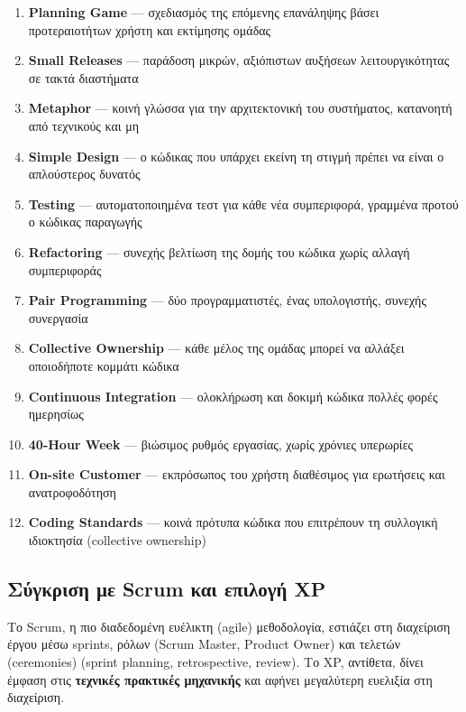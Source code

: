 \documentclass[11pt,a4paper,greek,twoside]{template-xe}
\providecommand{\tightlist}{\setlength{\itemsep}{0pt}\setlength{\parskip}{0pt}}
\begin{document}
\begin{enumerate}
\def\labelenumi{\arabic{enumi}.}
\tightlist
\item
  \textbf{Planning Game} --- σχεδιασμός της επόμενης επανάληψης βάσει
  προτεραιοτήτων χρήστη και εκτίμησης ομάδας
\item
  \textbf{Small Releases} --- παράδοση μικρών, αξιόπιστων αυξήσεων
  λειτουργικότητας σε τακτά διαστήματα
\item
  \textbf{Metaphor} --- κοινή γλώσσα για την αρχιτεκτονική του
  συστήματος, κατανοητή από τεχνικούς και μη
\item
  \textbf{Simple Design} --- ο κώδικας που υπάρχει εκείνη τη στιγμή
  πρέπει να είναι ο απλούστερος δυνατός
\item
  \textbf{Testing} --- αυτοματοποιημένα τεστ για κάθε νέα συμπεριφορά,
  γραμμένα προτού ο κώδικας παραγωγής
\item
  \textbf{Refactoring} --- συνεχής βελτίωση της δομής του κώδικα χωρίς
  αλλαγή συμπεριφοράς
\item
  \textbf{Pair Programming} --- δύο προγραμματιστές, ένας υπολογιστής,
  συνεχής συνεργασία
\item
  \textbf{Collective Ownership} --- κάθε μέλος της ομάδας μπορεί να
  αλλάξει οποιοδήποτε κομμάτι κώδικα
\item
  \textbf{Continuous Integration} --- ολοκλήρωση και δοκιμή κώδικα
  πολλές φορές ημερησίως
\item
  \textbf{40-Hour Week} --- βιώσιμος ρυθμός εργασίας, χωρίς χρόνιες
  υπερωρίες
\item
  \textbf{On-site Customer} --- εκπρόσωπος του χρήστη διαθέσιμος για
  ερωτήσεις και ανατροφοδότηση
\item
  \textbf{Coding Standards} --- κοινά πρότυπα κώδικα που επιτρέπουν τη
  συλλογική ιδιοκτησία (collective ownership)
\end{enumerate}

\subsection{Σύγκριση με Scrum και επιλογή
XP}\label{ux3c3ux3cdux3b3ux3baux3c1ux3b9ux3c3ux3b7-ux3bcux3b5-scrum-ux3baux3b1ux3b9-ux3b5ux3c0ux3b9ux3bbux3bfux3b3ux3ae-xp}

Το Scrum, η πιο διαδεδομένη ευέλικτη (agile) μεθοδολογία, εστιάζει στη
διαχείριση έργου μέσω sprints, ρόλων (Scrum Master, Product Owner) και
τελετών (ceremonies) (sprint planning, retrospective, review). Το XP,
αντίθετα, δίνει έμφαση στις \textbf{τεχνικές πρακτικές μηχανικής} και
αφήνει μεγαλύτερη ευελιξία στη διαχείριση.
\end{document}
